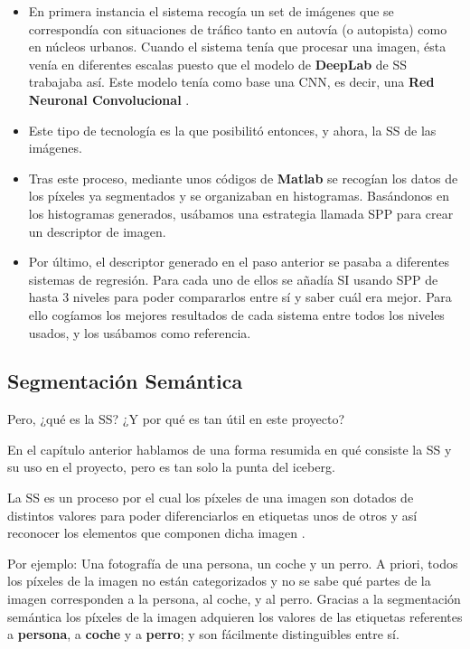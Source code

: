 \begin{itemize}
\item En primera instancia el sistema recogía un set de imágenes que se correspondía con situaciones de tráfico tanto en autovía (o autopista) como en núcleos urbanos. Cuando el sistema tenía que procesar una imagen, ésta venía en diferentes escalas puesto que el modelo de \textbf{DeepLab} de \ac{SS} trabajaba así. Este modelo tenía como base una \ac{CNN}, es decir, una \textbf{Red Neuronal Convolucional} \cite{cnn}.
 
\item Este tipo de tecnología es la que posibilitó entonces, y ahora, la \ac{SS} de las imágenes.

\item Tras este proceso, mediante unos códigos de \textbf{Matlab} se recogían los datos de los píxeles ya segmentados y se organizaban en histogramas. Basándonos en los histogramas generados, usábamos una estrategia llamada \ac{SPP} \cite{spp} para crear un descriptor de imagen.

\item Por último, el descriptor generado en el paso anterior se pasaba a diferentes sistemas de regresión. Para cada uno de ellos se añadía \ac{SI} \cite{spp} usando \ac{SPP} de hasta 3 niveles para poder compararlos entre sí y saber cuál era mejor. Para ello cogíamos los mejores resultados de cada sistema entre todos los niveles usados, y los usábamos como referencia.

\end{itemize}

\subsection{Segmentación Semántica}

Pero, ¿qué es la \ac{SS}? ¿Y por qué es tan útil en este proyecto?

En el capítulo anterior hablamos de una forma resumida en qué consiste la \ac{SS} y su uso en el proyecto, pero es tan solo la punta del iceberg.


La \ac{SS} es un proceso por el cual los píxeles de una imagen son dotados de distintos valores para poder diferenciarlos en etiquetas unos de otros y así reconocer los elementos que componen dicha imagen \cite{deeplab}. 

Por ejemplo: Una fotografía de una persona, un coche y un perro. A priori, todos los píxeles de la imagen no están categorizados y no se sabe qué partes de la imagen corresponden a la persona, al coche, y al perro. Gracias a la segmentación semántica los píxeles de la imagen adquieren los valores de las etiquetas referentes a \textbf{persona}, a \textbf{coche} y a \textbf{perro}; y son fácilmente distinguibles entre sí.

